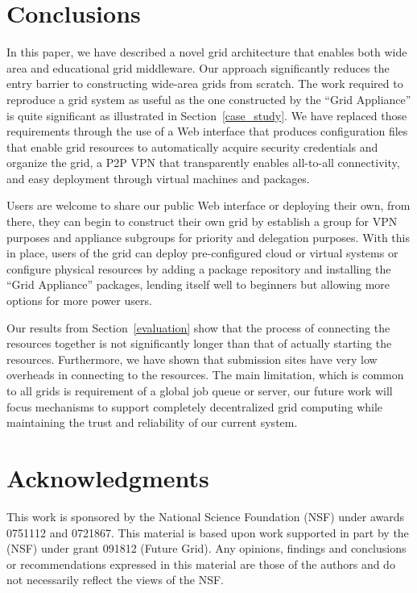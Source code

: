\documentclass[conference]{IEEEtran}
\begin{document}
\section{Conclusions}
\label{conclusions}

In this paper, we have described a novel grid architecture that enables both
wide area and educational grid middleware.  Our approach significantly reduces
the entry barrier to constructing wide-area grids from scratch.  The work
required to reproduce a grid system as useful as the one constructed by the
``Grid Appliance'' is quite significant as illustrated in
Section~\ref{case_study}.  We have replaced those requirements through the use
of a Web interface that produces configuration files that enable grid resources
to automatically acquire security credentials and organize the grid, a P2P VPN
that transparently enables all-to-all connectivity, and easy deployment through
virtual machines and packages.

Users are welcome to share our public Web interface or deploying their own,
from there, they can begin to construct their own grid by establish a group for
VPN purposes and appliance subgroups for priority and delegation purposes.
With this in place, users of the grid can deploy pre-configured cloud or
virtual systems or configure physical resources by adding a package repository
and installing the ``Grid Appliance'' packages, lending itself well to
beginners but allowing more options for more power users.

Our results from Section~\ref{evaluation} show that the process of connecting
the resources together is not significantly longer than that of actually
starting the resources.  Furthermore, we have shown that submission sites have
very low overheads in connecting to the resources.  The main limitation, which
is common to all grids is requirement of a global job queue or server, our
future work will focus mechanisms to support completely decentralized grid
computing while maintaining the trust and reliability of our current system.

\section*{Acknowledgments}

This work is sponsored by the National Science Foundation (NSF) under awards
0751112 and 0721867.  This material is based upon work supported in part by the
(NSF) under grant 091812 (Future Grid).  Any opinions, findings and conclusions
or recommendations expressed in this material are those of the authors and do
not necessarily reflect the views of the NSF.



\end{document}
